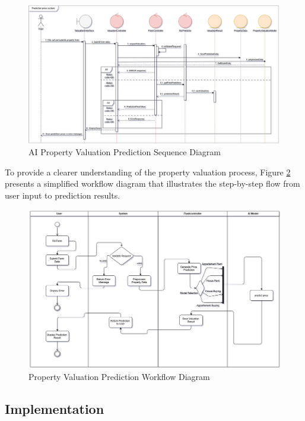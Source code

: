 \begin{figure}[htbp]
    \centering
    \includegraphics[width=1.1\textwidth]{images/sequence_AI_prediction_model.png}
    \caption{AI Property Valuation Prediction Sequence Diagram}
    \label{fig:ai-prediction-sequence-model}
\end{figure}

To provide a clearer understanding of the property valuation process, Figure \ref{fig:valuation-workflow} presents a simplified workflow diagram that illustrates the step-by-step flow from user input to prediction results.
\newpage
\begin{figure}[htbp]
    \centering
    \includegraphics[width=1\textwidth]{images/valuation_workflow_diagram.png}
    \caption{Property Valuation Prediction Workflow Diagram}
    \label{fig:valuation-workflow}
\end{figure}

\subsection{Implementation}
